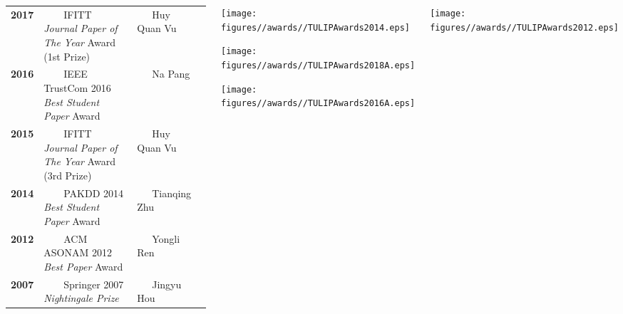 \documentclass{tikzposter} %
\begin{document}
\begin{columns}
{{\begin{minipage}{\linewidth}
\begin{tabular}{ >{\centering}p{0.12\linewidth}  | p{0.58\linewidth} | p{0.18\linewidth}   r }
						\textbf{2017} & ~~~~IFITT \textit{Journal Paper of The Year} Award (1st Prize) & ~~~Huy Quan Vu &  \\
						
						\textbf{2016} & ~~~~IEEE TrustCom 2016 \textit{Best Student Paper} Award & ~~~Na Pang &  \\
						
						\textbf{2015} & ~~~~IFITT \textit{Journal Paper of The Year} Award (3rd Prize) & ~~~Huy Quan Vu &  \\
						
						\textbf{2014} & ~~~~PAKDD 2014 \textit{Best Student Paper} Award & ~~~Tianqing Zhu &  \\
						
						\textbf{2012} & ~~~~ACM ASONAM 2012  \textit{Best Paper} Award & ~~~Yongli Ren &  \\
						
						\textbf{2007} & ~~~~Springer 2007 \textit{Nightingale Prize} & ~~~Jingyu Hou &  \\
						\bottomrule
					\end{tabular}
				\end{minipage}
			}		
			\hfill
			
			\begin{minipage}{\linewidth}
				\vspace{1.5cm}
				\begin{multicols}{3}
				\centering
				\begin{minipage}{\linewidth}
					\centering
					\texttt{[image: figures//awards//TULIPAwards2014.eps]}
				\end{minipage}
				
				\begin{minipage}{\linewidth}
					\texttt{[image: figures//awards//TULIPAwards2018A.eps]}
				\end{minipage}	
				\hspace{-5.6cm}
				\begin{minipage}{\linewidth}
					\texttt{[image: figures//awards//TULIPAwards2016A.eps]}
				\end{minipage}				
				\end{multicols}
			\end{minipage}
			
			\vspace{-0.5cm}
						
			\begin{minipage}{\linewidth}
				\begin{multicols}{3}
				\centering
				\begin{minipage}{\linewidth}
					\centering
					\texttt{[image: figures//awards//TULIPAwards2012.eps]}
				\end{minipage}
				

\end{multicols}
\end{minipage}}
\end{columns}
\end{document}
